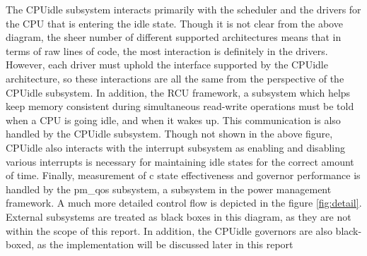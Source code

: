 \documentclass[10pt,preprint]{sigplanconf}
\begin{document}
    The CPUidle subsystem interacts primarily with the scheduler and the drivers for the CPU that is entering the idle state. Though it is not clear from the above diagram, the sheer number of different supported architectures means that in terms of raw lines of code, the most interaction is definitely in the drivers. However, each driver must uphold the interface supported by the CPUidle architecture, so these interactions are all the same from the perspective of the CPUidle subsystem. In addition, the RCU framework, a subsystem which helps keep memory consistent during simultaneous read-write operations must be told when a CPU is going idle, and when it wakes up. This communication is also handled by the CPUidle subsystem. Though not shown in the above figure, CPUidle also interacts with the interrupt subsystem as enabling and disabling various interrupts is necessary for maintaining idle states for the correct amount of time.  Finally, measurement of c state effectiveness and governor performance is handled by the pm\_qos subsystem, a subsystem in the power management framework.
    A much more detailed control flow is depicted in the figure \ref{fig:detail}. External subsystems are treated as black boxes in this diagram, as they are not within the scope of this report. In addition, the CPUidle governors are also black-boxed, as the implementation will be discussed later in this report
\end{document}
